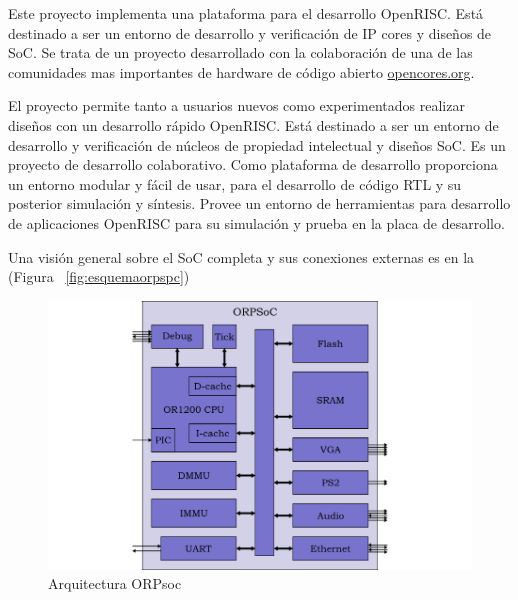 				Este proyecto implementa una plataforma para el desarrollo OpenRISC. Está destinado a ser un entorno de desarrollo y verificación de IP cores y
				diseños de SoC. Se trata de un proyecto desarrollado con la colaboración de una de las comunidades mas importantes de hardware de código abierto
				\url{opencores.org}.


El proyecto permite tanto a usuarios nuevos como experimentados realizar diseños con un desarrollo rápido OpenRISC. Está destinado a ser un entorno de desarrollo y verificación de núcleos de propiedad intelectual y diseños SoC. Es un proyecto de desarrollo colaborativo. Como plataforma de desarrollo proporciona un entorno modular y fácil de usar, para el desarrollo de código RTL y su posterior simulación y síntesis. Provee un entorno de herramientas para desarrollo de aplicaciones OpenRISC para su simulación y prueba en la placa de desarrollo.

Una visión general sobre el SoC completa y sus conexiones externas es en la  (Figura ~\ref{fig:esquemaorpspc})

\begin{figure}[h!]
 \begin{center}
  \includegraphics[width=1\textwidth,keepaspectratio=true]{./images/orpsoc}
  \caption{Arquitectura ORPsoc}
  \label{fig:esquemaorpsoc}
 \end{center}
\end{figure}

